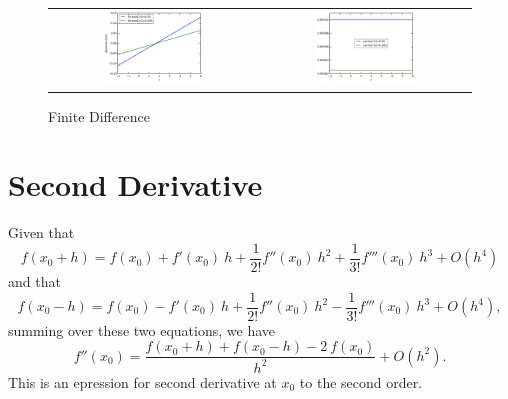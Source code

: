 \documentclass[11pt,letterpaper]{article}
\begin{document}
\begin{figure}
\centering
\begin{tabular}{cc}
    \includegraphics[width={0.49\textwidth}]{fig1.pdf} &
    \includegraphics[width={0.49\textwidth}]{fig2.pdf} \\
\end{tabular}
\caption{Finite Difference}
\label{fig1}
\end{figure}


\section{Second Derivative}
Given that
\begin{equation}
  f(x_0+h) = f(x_0) + f'(x_0)~h + \frac{1}{2!} f''(x_0)~h^2 + \frac{1}{3!} f'''(x_0)~h^3 + O(h^4)
\end{equation}
and that
\begin{equation}
  f(x_0-h) = f(x_0) - f'(x_0)~h + \frac{1}{2!} f''(x_0)~h^2 - \frac{1}{3!} f'''(x_0)~h^3 + O(h^4) ,
\end{equation}
summing over these two equations, we have 
\begin{equation}
  f''(x_0) = \frac{f(x_0+h) + f(x_0-h) -2~f(x_0)}{h^2} + O(h^2) .
\end{equation}
This is an epression for second derivative at $x_0$ to the second order.
\end{document}
